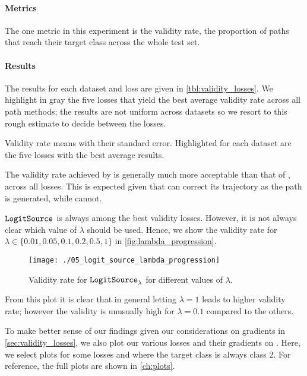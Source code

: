 \documentclass[../main.tex]{subfiles}
\begin{document}
\paragraph{Metrics}

The one metric in this experiment is the validity rate, \ie{} the proportion of paths that reach their target class across the whole test set.

\paragraph{Results}

The results for each dataset and loss are given in \autoref{tbl:validity_losses}.
We highlight in gray the five losses that yield the best average validity rate across all path methods; the results are not uniform across datasets so we resort to this rough estimate to decide between the losses.

\begin{table}[h!]
\centering

\caption{Validity rate means with their standard error. Highlighted for each dataset are the five losses with the best average results.}
\label{tbl:validity_losses}
\end{table}

The validity rate achieved by \revise{} is generally much more acceptable than that of \ls{}, across all losses.
This is expected given that \revise{} can correct its trajectory as the path is generated, while \ls{} cannot.

$\mathtt{LogitSource}_{}$ is always among the best validity losses.
However, it is not always clear which value of $\lambda$ should be used.
Hence, we show the validity rate for $\lambda \in \{ 0.01, 0.05, 0.1, 0.2, 0.5, 1\}$ in \autoref{fig:lambda_progression}.

\begin{figure}[htbp]
    \centering
\texttt{[image: ./05\_logit\_source\_lambda\_progression]}

    \caption{Validity rate for $\mathtt{LogitSource}_{\lambda}$ for different values of $\lambda$.}
    \label{fig:lambda_progression}
\end{figure}

From this plot it is clear that in general letting $\lambda = 1$ leads to higher validity rate;
however the validity is unusually high for $\lambda = 0.1$ compared to the others.

To make better sense of our findings given our considerations on gradients in \autoref{sec:validity_losses},
we also plot our various losses and their gradients on \CakeOnSea.
Here, we select plots for some losses and where the target class is always class 2.
For reference, the full plots are shown in \autoref{ch:plots}.
\end{document}

